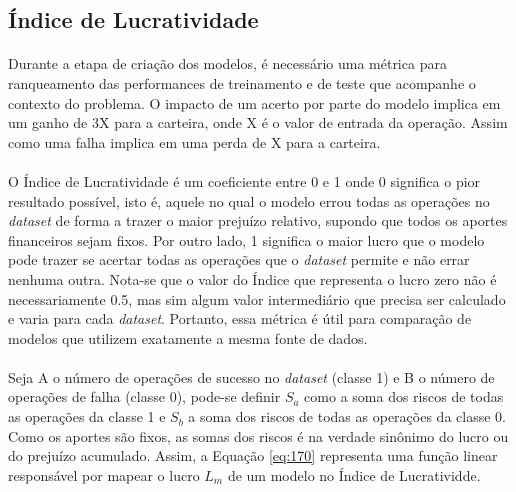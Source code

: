 \FloatBarrier
\subsection{Índice de Lucratividade}
\label{sub:profit_index}

\paragraph{} Durante a etapa de criação dos modelos, é necessário uma métrica para ranqueamento das performances de treinamento e de teste que acompanhe o contexto do problema. O impacto de um acerto por parte do modelo implica em um ganho de 3X para a carteira, onde X é o valor de entrada da operação. Assim como uma falha implica em uma perda de X para a carteira.

\paragraph{} O Índice de Lucratividade é um coeficiente entre 0 e 1 onde 0 significa o pior resultado possível, isto é, aquele no qual o modelo errou todas as operações no \textit{dataset} de forma a trazer o maior prejuízo relativo, supondo que todos os aportes financeiros sejam fixos. Por outro lado, 1 significa o maior lucro que o modelo pode trazer se acertar todas as operações que o \textit{dataset} permite e não errar nenhuma outra. Nota-se que o valor do Índice que representa o lucro zero não é necessariamente 0.5, mas sim algum valor intermediário que precisa ser calculado e varia para cada \textit{dataset}. Portanto, essa métrica é útil para comparação de modelos que utilizem exatamente a mesma fonte de dados.

\paragraph{} Seja A o número de operações de sucesso no \textit{dataset} (classe 1) e B o número de operações de falha (classe 0), pode-se definir \begin{math} S_a \end{math} como a soma dos riscos de todas as operações da classe 1 e \begin{math} S_b \end{math} a soma dos riscos de todas as operações da classe 0. Como os aportes são fixos, as somas dos riscos é na verdade sinônimo do lucro ou do prejuízo acumulado. Assim, a Equação \ref{eq:170} representa uma função linear responsável por mapear o lucro \begin{math} L_m \end{math} de um modelo no Índice de Lucratividde.

